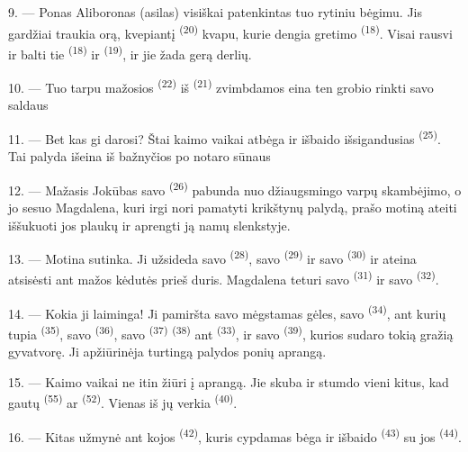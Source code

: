 9. --- Ponas Aliboronas (asilas) visiškai patenkintas tuo rytiniu bėgimu. Jis
gardžiai traukia orą, kvepiantį  \textsuperscript{(20)} kvapu, kurie
dengia gretimo   \textsuperscript{(18)}.
Visai rausvi ir balti tie  \textsuperscript{(18)} ir
 \textsuperscript{(19)}, ir jie žada gerą derlių.

10. --- Tuo tarpu mažosios  \textsuperscript{(22)} iš 
\textsuperscript{(21)} zvimbdamos eina ten grobio rinkti savo saldaus

11. --- Bet kas gi darosi? Štai kaimo vaikai atbėga ir išbaido išsigandusias
 \textsuperscript{(25)}. Tai palyda išeina iš bažnyčios po notaro sūnaus

12. --- Mažasis Jokūbas savo  \textsuperscript{(26)} pabunda nuo
džiaugsmingo varpų skambėjimo, o jo sesuo Magdalena, kuri irgi nori pamatyti
krikštynų palydą, prašo motiną ateiti iššukuoti jos plaukų ir aprengti ją namų
slenkstyje.

13. --- Motina sutinka. Ji užsideda savo  \textsuperscript{(28)}, savo
 \textsuperscript{(29)} ir savo  \textsuperscript{(30)}
ir ateina atsisėsti ant mažos kėdutės prieš duris. Magdalena teturi savo
 \textsuperscript{(31)} ir savo 
\textsuperscript{(32)}.

14. --- Kokia ji laiminga! Ji pamiršta savo mėgstamas gėles, savo
 \textsuperscript{(34)}, ant kurių tupia 
\textsuperscript{(35)}, savo  \textsuperscript{(36)}, savo
 \textsuperscript{(37)}  \textsuperscript{(38)} ant
 \textsuperscript{(33)}, ir savo  \textsuperscript{(39)},
kurios sudaro tokią gražią gyvatvorę. Ji apžiūrinėja turtingą palydos ponių aprangą.

15. --- Kaimo vaikai ne itin žiūri į aprangą. Jie skuba ir stumdo vieni kitus, kad
gautų  \textsuperscript{(55)} ar 
\textsuperscript{(52)}. Vienas iš jų verkia \textsuperscript{(40)}.

16. --- Kitas užmynė ant kojos  \textsuperscript{(42)}, kuris
cypdamas bėga ir išbaido  \textsuperscript{(43)} su jos
 \textsuperscript{(44)}.

